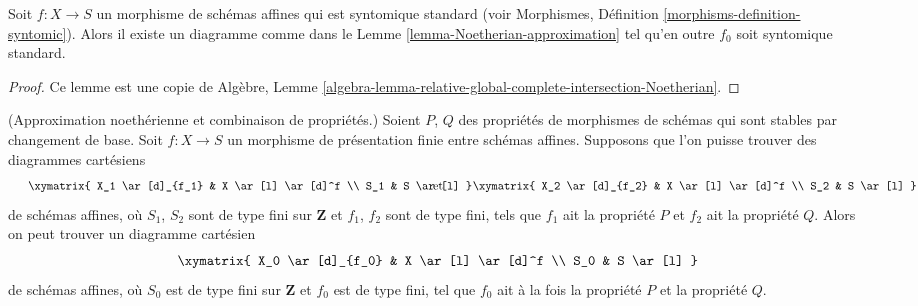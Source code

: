\begin{lemma}
\label{lemma-Noetherian-approximation-standard-syntomic}
Soit $f : X \to S$ un morphisme de schémas affines qui est
syntomique standard (voir
Morphismes, Définition \ref{morphisms-definition-syntomic}).
Alors il existe un diagramme comme dans le
Lemme \ref{lemma-Noetherian-approximation}
tel qu'en outre $f_0$ soit syntomique standard.
\end{lemma}

\begin{proof}
Ce lemme est une copie de
Algèbre,
Lemme \ref{algebra-lemma-relative-global-complete-intersection-Noetherian}.
\end{proof}

\begin{lemma}
\label{lemma-Noetherian-approximation-combine}
(Approximation noethérienne et combinaison de propriétés.)
Soient $P$, $Q$ des propriétés de morphismes de schémas qui sont stables
par changement de base. Soit $f : X \to S$ un morphisme de présentation finie
entre schémas affines. Supposons que l'on puisse trouver des diagrammes cartésiens
$$
\vcenter{
\xymatrix{
X_1 \ar[d]_{f_1} & X \ar[l] \ar[d]^f \\
S_1 & S \ar[l]
}
}
\quad\text{et}\quad
\vcenter{
\xymatrix{
X_2 \ar[d]_{f_2} & X \ar[l] \ar[d]^f \\
S_2 & S \ar[l]
}
}
$$
de schémas affines, où $S_1$, $S_2$ sont de type fini sur $\mathbf{Z}$
et $f_1$, $f_2$ sont de type fini, tels que $f_1$ ait la propriété $P$
et $f_2$ ait la propriété $Q$. Alors on peut trouver un diagramme cartésien
$$
\xymatrix{
X_0 \ar[d]_{f_0} & X \ar[l] \ar[d]^f \\
S_0 & S \ar[l]
}
$$
de schémas affines, où $S_0$ est de type fini sur $\mathbf{Z}$
et $f_0$ est de type fini, tel que $f_0$ ait à la fois la propriété $P$ et
la propriété $Q$.
\end{lemma}

